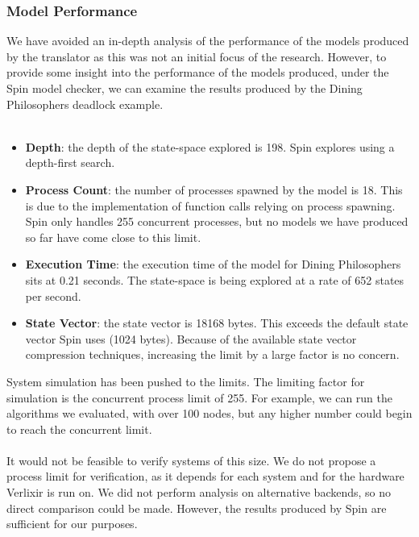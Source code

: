 \subsubsection{Model Performance}
We have avoided an in-depth analysis of the performance of the models produced by the translator as this was not an initial focus of the research. However, to provide some insight into the performance of the models produced, under the Spin model checker, we can examine the results produced by the Dining Philosophers deadlock example.
\\ \\
\begin{itemize}
    \item \textbf{Depth}: the depth of the state-space explored is 198. Spin explores using a depth-first search. 
    \item \textbf{Process Count}: the number of processes spawned by the model is 18. This is due to the implementation of function calls relying on process spawning. Spin only handles 255 concurrent processes, but no models we have produced so far have come close to this limit.
    \item \textbf{Execution Time}: the execution time of the model for Dining Philosophers sits at 0.21 seconds. The state-space is being explored at a rate of 652 states per second.
    \item \textbf{State Vector}: the state vector is 18168 bytes. This exceeds the default state vector Spin uses (1024 bytes). Because of the available state vector compression techniques, increasing the limit by a large factor is no concern.
\end{itemize}
System simulation has been pushed to the limits. The limiting factor for simulation is the concurrent process limit of 255. For example, we can run the algorithms we evaluated, with over 100 nodes, but any higher number could begin to reach the concurrent limit. 
\\ \\
It would not be feasible to verify systems of this size. We do not propose a process limit for verification, as it depends for each system and for the hardware Verlixir is run on. We did not perform analysis on alternative backends, so no direct comparison could be made. However, the results produced by Spin are sufficient for our purposes.
